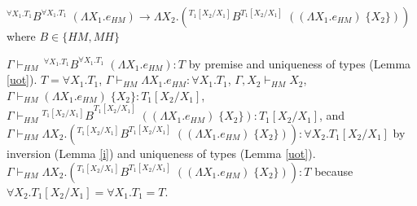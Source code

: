 \begin{case}
$^{\forall X_{1}.T_{1}}B^{\forall X_{1}.T_{1}}\;(\Lambda X_{1}.e_{HM})\rightarrow\Lambda X_{2}.(^{T_{1}[X_{2}/X_{1}]}B^{T_{1}[X_{2}/X_{1}]}\;((\Lambda X_{1}.e_{HM})\;\lbrace X_{2}\rbrace))$ where $B\in\lbrace HM,MH\rbrace$

$\Gamma\vdash_{HM}\,^{\forall X_{1}.T_{1}}B^{\forall X_{1}.T_{1}}\;(\Lambda X_{1}.e_{HM}):T$ by premise and uniqueness of types (Lemma \ref{uot}).  $T=\forall X_{1}.T_{1}$, $\Gamma\vdash_{HM}\Lambda X_{1}.e_{HM}:\forall X_{1}.T_{1}$, $\Gamma,X_{2}\vdash_{HM}X_{2}$, $\Gamma\vdash_{HM}(\Lambda X_{1}.e_{HM})\;\lbrace X_{2}\rbrace:T_{1}[X_{2}/X_{1}]$, $\Gamma\vdash_{HM}{^{T_{1}[X_{2}/X_{1}]}B}^{T_{1}[X_{2}/X_{1}]}\;((\Lambda X_{1}.e_{HM})\;\lbrace X_{2}\rbrace):T_{1}[X_{2}/X_{1}]$, and $\Gamma\vdash_{HM}\Lambda X_{2}.(^{T_{1}[X_{2}/X_{1}]}B^{T_{1}[X_{2}/X_{1}]}\;((\Lambda X_{1}.e_{HM})\;\lbrace X_{2}\rbrace)):\forall X_{2}.T_{1}[X_{2}/X_{1}]$ by inversion (Lemma \ref{i}) and uniqueness of types (Lemma \ref{uot}).  $\Gamma\vdash_{HM}\Lambda X_{2}.(^{T_{1}[X_{2}/X_{1}]}B^{T_{1}[X_{2}/X_{1}]}\;((\Lambda X_{1}.e_{HM})\;\lbrace X_{2}\rbrace)):T$ because $\forall X_{2}.T_{1}[X_{2}/X_{1}]=\forall X_{1}.T_{1}=T$.
\end{case}